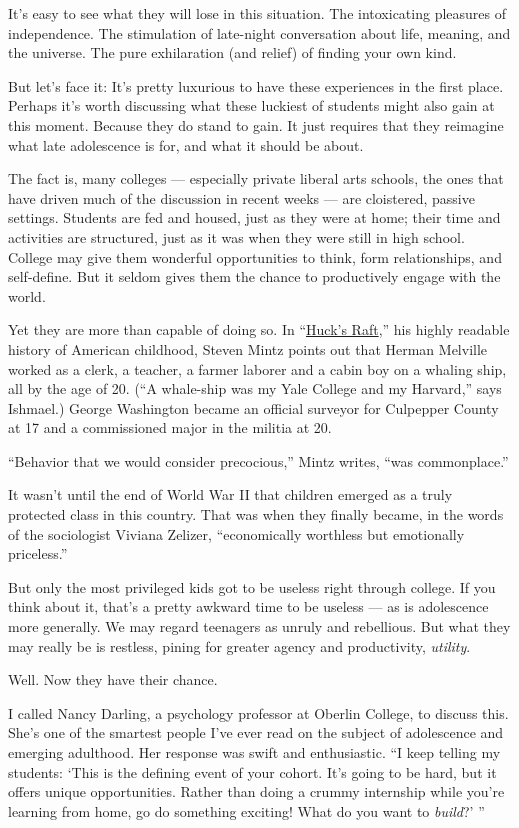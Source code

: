 It's easy to see what they will lose in this situation. The intoxicating
pleasures of independence. The stimulation of late-night conversation
about life, meaning, and the universe. The pure exhilaration (and
relief) of finding your own kind.

But let's face it: It's pretty luxurious to have these experiences in
the first place. Perhaps it's worth discussing what these luckiest of
students might also gain at this moment. Because they do stand to gain.
It just requires that they reimagine what late adolescence is for, and
what it should be about.

The fact is, many colleges --- especially private liberal arts schools,
the ones that have driven much of the discussion in recent weeks --- are
cloistered, passive settings. Students are fed and housed, just as they
were at home; their time and activities are structured, just as it was
when they were still in high school. College may give them wonderful
opportunities to think, form relationships, and self-define. But it
seldom gives them the chance to productively engage with the world.

Yet they are more than capable of doing so. In
``\href{https://www.publishersweekly.com/978-0-674-01508-1}{Huck's
Raft},'' his highly readable history of American childhood, Steven Mintz
points out that Herman Melville worked as a clerk, a teacher, a farmer
laborer and a cabin boy on a whaling ship, all by the age of 20. (``A
whale-ship was my Yale College and my Harvard,'' says Ishmael.) George
Washington became an official surveyor for Culpepper County at 17 and a
commissioned major in the militia at 20.

``Behavior that we would consider precocious,'' Mintz writes, ``was
commonplace.''

It wasn't until the end of World War II that children emerged as a truly
protected class in this country. That was when they finally became, in
the words of the sociologist Viviana Zelizer, ``economically worthless
but emotionally priceless.''

But only the most privileged kids got to be useless right through
college. If you think about it, that's a pretty awkward time to be
useless --- as is adolescence more generally. We may regard teenagers as
unruly and rebellious. But what they may really be is restless, pining
for greater agency and productivity, \emph{utility}.

Well. Now they have their chance.

I called Nancy Darling, a psychology professor at Oberlin College, to
discuss this. She's one of the smartest people I've ever read on the
subject of adolescence and emerging adulthood. Her response was swift
and enthusiastic. ``I keep telling my students: `This is the defining
event of your cohort. It's going to be hard, but it offers unique
opportunities. Rather than doing a crummy internship while you're
learning from home, go do something exciting! What do you want to
\emph{build}?' ''

